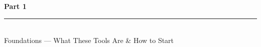 \documentclass[aspectratio=169, 10pt]{beamer}
\begin{document}

{
\begin{frame}
\centering\vfill
{\fontsize{22}{28}\bfseries\selectfont\color{white} Part 1}\\[6pt]
{\color{UVMGold}\rule{5cm}{0.8pt}}\\[6pt]
{\normalsize\color{UVMGold} Foundations --- What These Tools Are \& How to Start}
\vfill
\end{frame}
}
\end{document}
